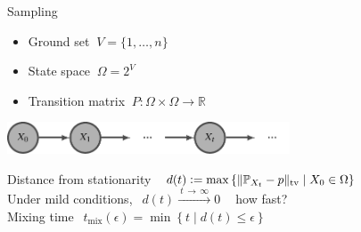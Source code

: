 \documentclass[mathserif]{beamer}
\newcommand{\defeq}{\vcentcolon=}
\begin{document}
\begin{frame}{Sampling}
\begin{itemize}
\item Ground set $\ V = \{1,\ldots,n\}$
\item State space $\ \Omega = 2^V$
\item Transition matrix $\ P : \Omega \times \Omega \to \mathbb{R}$
\end{itemize}

\begin{center}
\includegraphics[width=3.3in]{figures/markov.pdf}
\end{center}

\vspace{1em}
Distance from stationarity $\ \ d(t) \defeq \max \left\{\|\mathbb{P}_{X_t} - p\|_{\textrm{tv}} \mid X_0 \in \Omega\right\}$\\[1.5em]
Under mild conditions, $\ \ d(t) \xrightarrow{\ t\,\rightarrow\,\infty\ } 0\ \ \ \ $ {\color{col2} how fast?}\\[1.6em]
Mixing time $\ \ t_{\textrm{mix}}(\epsilon) = \min \left\{t \mid d(t) \leq \epsilon \right\}$
\end{frame}
\end{document}
